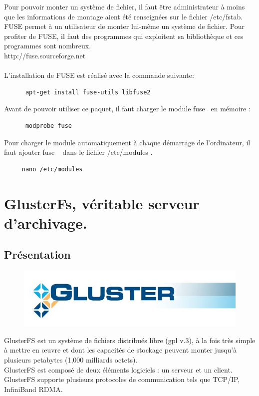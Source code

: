 \documentclass[12pt]{report}
\begin{document}
    Pour pouvoir monter un système de fichier, il faut être administrateur à moins que les informations de montage aient été renseignées sur le fichier /etc/fstab.\\
    FUSE permet à un utilisateur de monter lui-même un système de fichier. Pour profiter de FUSE, il faut des programmes qui exploitent sa bibliothèque
    et  ces programmes sont nombreux.\\
    http://fuse.sourceforge.net\\\\
    L'installation de FUSE est réalisé avec la commande suivante:\\
    \begin{lstlisting}
	  apt-get install fuse-utils libfuse2
	  \end{lstlisting}
    Avant de pouvoir utiliser ce paquet, il faut charger le module \og fuse\fg~ en mémoire :\\
    \begin{lstlisting}
	  modprobe fuse
	  \end{lstlisting}
    Pour charger le module automatiquement à chaque démarrage de l'ordinateur, il faut ajouter \og fuse \fg~ dans le fichier \og /etc/modules \fg.\\
    \begin{lstlisting}
	 nano /etc/modules
	 \end{lstlisting}

	\chapter{GlusterFs, véritable serveur d'archivage.}
		\section{Présentation}

		\begin{figure}[H]
			\begin{center}
				\includegraphics[width=0.6\linewidth]{images/glusterfs.png}
			\end{center}
		\end{figure}

GlusterFS est un système de fichiers distribués libre (gpl v.3), à la fois très simple à mettre en œuvre et dont les capacités de stockage peuvent monter jusqu'à plusieurs petabytes (1,000 milliards octets).\\
GlusterFS est composé de deux éléments logiciels : un serveur et un client.\\
GlusterFS supporte plusieurs protocoles de communication tels que TCP/IP, InfiniBand RDMA.\\
\end{document}
